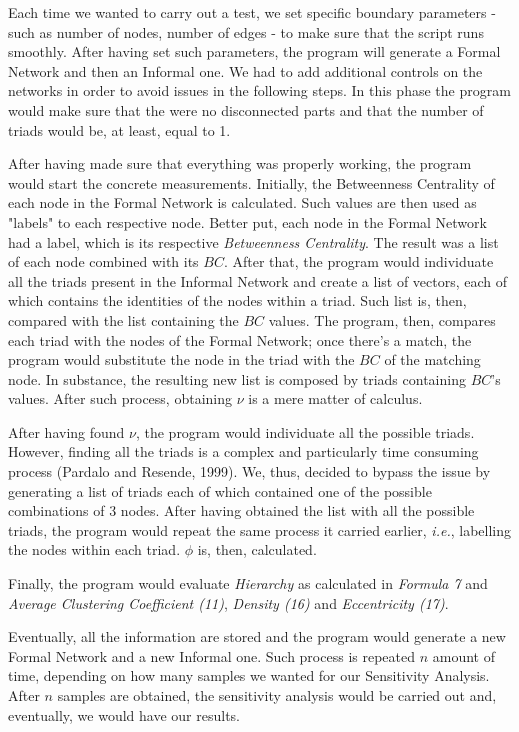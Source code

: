 \documentclass{article}
\begin{document}
Each time we wanted to carry out a test, we set specific boundary parameters - such as number of nodes, number of edges - to make sure that the script runs smoothly. After having set such parameters, the program will generate a Formal Network and then an Informal one. We had to add additional controls on the networks in order to avoid issues in the following steps. In this phase the program would make sure that the were no disconnected parts and that the number of triads would be, at least, equal to 1. 

After having made sure that everything was properly working, the program would start the concrete measurements. Initially, the Betweenness Centrality of each node in the Formal Network is calculated. Such values are then used as "labels" to each respective node. Better put, each node in the Formal Network had a label, which is its respective \emph{Betweenness Centrality}. The result was a list of each node combined with its $BC$. After that, the program would individuate all the triads present in the Informal Network and create a list of vectors, each of which contains the identities of the nodes within a triad. Such list is, then, compared with the list containing the $BC$ values. The program, then, compares each triad with the nodes of the Formal Network; once there's a match, the program would substitute the node in the triad with the $BC$ of the matching node. In substance, the resulting new list is composed by triads containing $BC$'s values. After such process, obtaining $\nu$ is a mere matter of calculus.

After having found $\nu$, the program would individuate all the possible triads. However, finding all the triads is a complex and particularly time consuming process (Pardalo and Resende, 1999). We, thus, decided to bypass the issue by generating a list of triads each of which contained one of the possible combinations of 3 nodes. After having obtained the list with all the possible triads, the program would repeat the same process it carried earlier, \emph{i.e.}, labelling the nodes within each triad. $\phi$ is, then, calculated.

Finally, the program would evaluate \emph{Hierarchy} as calculated in \emph{Formula 7} and \emph{Average Clustering Coefficient (11)}, \emph{Density (16)} and \emph{Eccentricity (17)}.

Eventually, all the information are stored and the program would generate a new Formal Network and a new Informal one. Such process is repeated $n$ amount of time, depending on how many samples we wanted for our Sensitivity Analysis. After $n$ samples are obtained, the sensitivity analysis would be carried out and, eventually, we would have our results.
\end{document}
